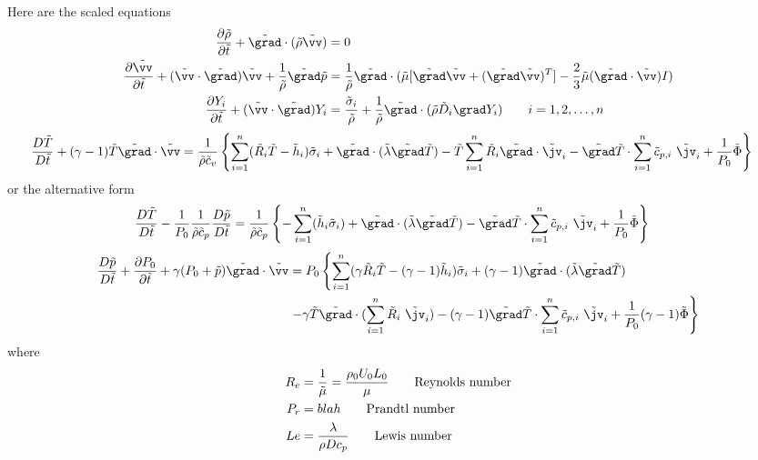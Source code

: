 \documentclass[10pt]{article}
\begin{document}
Here are the scaled equations
\begin{align*}
   {\partial \rhot  \over \partial \ttt} + \gradt\cdot(\rhot \vvt)&=0 \\
   {\partial \vvt  \over \partial \ttt}  + (\vvt\cdot\gradt)\vvt +{1\over\rhot} \gradt \pt  
            & = {1\over\rhot} \gradt\cdot( \mut [\gradt \vvt + (\gradt\vvt)^T] -{2\over3}\mut (\gradt\cdot\vvt)I) \\
  {\partial Y_i \over \partial \ttt} + (\vvt\cdot\gradt) Y_i &= {\sigmat_i \over \rhot}
               +{1\over\rhot}\gradt\cdot(\rhot \Dt_i\grad Y_i) \qquad i=1,2,\ldots,n
\end{align*}
\begin{align*}
  {D \Tt\over D\ttt} + (\gamma-1)\Tt\gradt\cdot\vvt & = 
       {1\over \rhot \ct_v}  \left\{ \sumi  ( \Rt_i \Tt - \hht_i) \sigmat_i 
+ \gradt\cdot(\lambdat\gradt \Tt)
- \Tt \sumi  \Rt_i \gradt\cdot\jvt_i - \gradt \Tt \cdot\sumi \ct_{p,i} ~\jvt_i
              + {1\over P_0} \Phit \right\} 
\end{align*}
or the alternative form
\begin{align*}
  {D \Tt\over D\ttt} - {1\over P_0} {1\over \rhot \ct_p} {D \pt\over D\ttt} & = 
       {1\over \rhot \ct_p}  \left\{ -\sumi (\hht_i\sigmat_i) + \gradt\cdot(\lambdat\gradt \Tt)
       - \gradt \Tt \cdot\sumi \ct_{p,i}  ~\jvt_i
               + {1\over P_0} \Phit \right\} 
\end{align*}
\begin{align*}
     {D \pt\over D\ttt}+ {\partial P_0 \over \partial \ttt} + \gamma (P_0 + \pt) \gradt\cdot\vvt &= 
    P_0 \left\{ \sumi  ({\gamma \Rt_i} \Tt - (\gamma-1) \hht_i) \sigmat_i 
        + (\gamma-1) \gradt\cdot(\lambdat\gradt \Tt) \right. \\
    &  \left. - \gamma \Tt \gradt\cdot( \sumi \Rt_i~\jvt_i) - (\gamma-1)\gradt \Tt\cdot\sumi \ct_{p,i}~\jvt_i
              + {1\over P_0} (\gamma-1) \Phit \right\}
\end{align*}
where
\begin{align*}
  R_e &= {1\over \tilde{\mu}} = {\rho_0 U_0 L_0 \over \mu}  \qquad \text{Reynolds number} \\
  P_r & =     blah                   \qquad \text{Prandtl number} \\
  Le & = {\lambda \over \rho D c_p } \qquad \text{Lewis number}
\end{align*}
\end{document}
